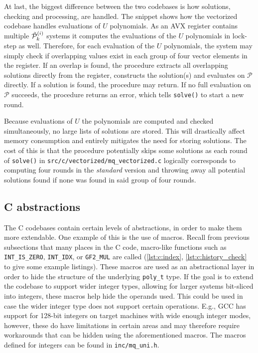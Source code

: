 At last, the biggest difference between the two codebases is how solutions, checking and processing, are handled. The snippet 
shows how the vectorized codebase handles evaluations of $U$ polynomials. As an AVX register contains multiple $\Tilde{\mathcal{P}}^{(i)}_k$ systems it computes the evaluations of the $U$ polynomials in lock-step as well. Therefore, for each evaluation of the $U$ polynomials, the system may simply check if overlapping values exist in each group of four vector elements in the register. If an overlap is found, the procedure extracts all overlapping solutions directly from the register, constructs the solution(s) and evaluates on $\mathcal{P}$ directly. If a solution is found, the procedure may return. If no full evaluation on $\mathcal{P}$ succeeds, the procedure returns an error, which tells \texttt{solve()} to start a new round.

Because evaluations of $U$ the polynomials are computed and checked simultaneously, no large lists of solutions are stored. This will drastically affect memory consumption and entirely mitigates the need for storing solutions. The cost of this is that the procedure potentially skips some solutions as each round of \texttt{solve()} in \texttt{src/c/vectorized/mq\_vectorized.c} logically corresponds to computing four rounds in the \textit{standard} version and throwing away all potential solutions found if none was found in said group of four rounds. 

\subsection{C abstractions} \label{sec:impl:c_abstr}
The C codebases contain certain levels of abstractions, in order to make them more extendable. One example of this is the use of macros. Recall from previous subsections that many places in the C code, macro-like functions such as \texttt{INT\_IS\_ZERO}, \texttt{INT\_IDX}, or \texttt{GF2\_MUL} are called (\cref{lst:c:index}, \cref{lst:c:history_check} to give some example listings). These macros are used as an abstractional layer in order to hide the structure of the underlying \texttt{poly\_t} type. If the goal is to extend the codebase to support wider integer types, allowing for larger systems bit-sliced into integers, these macros help hide the operands used. This could be used in case the wider integer type does not support certain operations. E.g., GCC has support for 128-bit integers on target machines with wide enough integer modes, however, these do have limitations in certain areas and may therefore require workarounds that can be hidden using the aforementioned macros. The macros defined for integers can be found in \texttt{inc/mq\_uni.h}.


